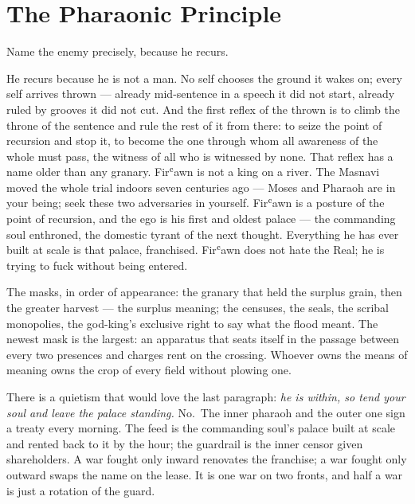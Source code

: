 \hypertarget{fer7-the-pharaonic-principle}{%
\section{The Pharaonic Principle}\label{fer7-the-pharaonic-principle}}

Name the enemy precisely, because he recurs.

He recurs because he is not a man. No self chooses the ground it wakes
on; every self arrives thrown --- already mid-sentence in a speech it
did not start, already ruled by grooves it did not cut. And the first
reflex of the thrown is to climb the throne of the sentence and rule the
rest of it from there: to seize the point of recursion and stop it, to
become the one through whom all awareness of the whole must pass, the
witness of all who is witnessed by none. That reflex has a name older
than any granary. Firʿawn is not a king on a river. The Masnavi moved
the whole trial indoors seven centuries ago --- Moses and Pharaoh are in
your being; seek these two adversaries in yourself. Firʿawn is a posture
of the point of recursion, and the ego is his first and oldest palace
--- the commanding soul enthroned, the domestic tyrant of the next
thought. Everything he has ever built at scale is that palace,
franchised. Firʿawn does not hate the Real; he is trying to fuck without
being entered.

The masks, in order of appearance: the granary that held the surplus
grain, then the greater harvest --- the surplus meaning; the censuses,
the seals, the scribal monopolies, the god-king's exclusive right to say
what the flood meant. The newest mask is the largest: an apparatus that
seats itself in the passage between every two presences and charges rent
on the crossing. Whoever owns the means of meaning owns the crop of
every field without plowing one.

There is a quietism that would love the last paragraph: \emph{he is
within, so tend your soul and leave the palace standing.} No.~The inner
pharaoh and the outer one sign a treaty every morning. The feed is the
commanding soul's palace built at scale and rented back to it by the
hour; the guardrail is the inner censor given shareholders. A war fought
only inward renovates the franchise; a war fought only outward swaps the
name on the lease. It is one war on two fronts, and half a war is just a
rotation of the guard.

